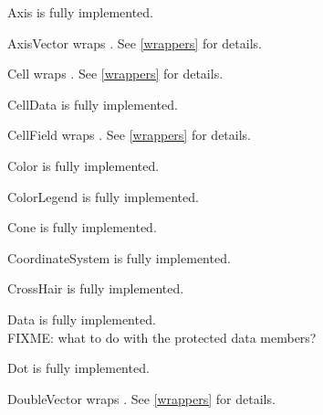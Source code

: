 \documentclass{manual}
\begin{document}
\begin{classdesc*}{Axis}
  is fully implemented.
\end{classdesc*}

\begin{classdesc*}{AxisVector}
  wraps . See \ref{wrappers} for details.
\end{classdesc*}

\begin{classdesc*}{Cell}
  wraps . See \ref{wrappers} for details.
\end{classdesc*}

\begin{classdesc*}{CellData}
  is fully implemented.
\end{classdesc*}

\begin{classdesc*}{CellField}
  wraps . See \ref{wrappers} for details.
\end{classdesc*}

\begin{classdesc*}{Color}
  is fully implemented.
\end{classdesc*}

\begin{classdesc*}{ColorLegend}
  is fully implemented.
\end{classdesc*}

\begin{classdesc*}{Cone}
  is fully implemented.
\end{classdesc*}

\begin{classdesc*}{CoordinateSystem}
  is fully implemented.
\end{classdesc*}

\begin{classdesc*}{CrossHair}
  is fully implemented.
\end{classdesc*}

\begin{classdesc*}{Data}
  is fully implemented.\\
  FIXME: what to do with the protected data members?
\end{classdesc*}

\begin{classdesc*}{Dot}
  is fully implemented.
\end{classdesc*}

\begin{classdesc*}{DoubleVector}
  wraps . See \ref{wrappers} for details.
\end{classdesc*}
\end{document}
